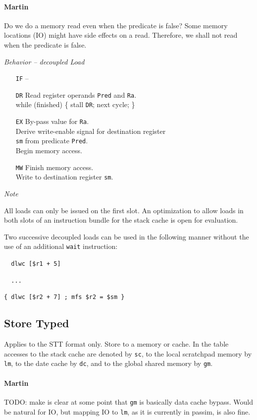 \documentclass{IEEEtran}
\newcommand{\code}[1]{{\texttt{#1}}}
\newcommand{\comment}[3]{\paragraph*{\textbf{#1}}{\color{#3}#2}}
\newcommand{\martin}[1]{\comment{Martin}{#1}{Blue}}
\newcommand{\NOT}{\texttildelow}
\begin{document}
\martin{Do we do a memory read even when the predicate is false?
Some memory locations (IO) might have side effects on a read.
Therefore, we shall not read when the predicate is false.}

\vspace{7mm}
\emph{Behavior -- decoupled Load}
\begin{itemize}
  \item[\texttt{IF}] --
  \item[\texttt{DR}] Read register operands \texttt{Pred} and \texttt{Ra}. \\
                     while (\NOT finished) \{ stall \texttt{DR}; next cycle; \}
  \item[\texttt{EX}] By-pass value for \texttt{Ra}. \\
                     Derive write-enable signal for destination register \\
                     \texttt{sm} from predicate \texttt{Pred}. \\
                     Begin memory access.
  \item[\texttt{MW}] Finish memory access. \\
                     Write to destination register \texttt{sm}.
\end{itemize}

\vspace{7mm}
\emph{Note}

All loads can only be issued on the first slot. An optimization to
allow loads in both slots of an instruction bundle for the stack cache
is open for evaluation.

Two successive decoupled loads can be used in the following manner without the
use of an additional \texttt{wait} instruction:

\texttt{~~dlwc   [\$r1 + 5]}

\texttt{~~...}

\texttt{\{ dlwc   [\$r2 + 7]   ;   mfs  \$r2 = \$sm \}}


\vspace{5mm}
\subsection{Store Typed} Applies to the STT format only. Store to a memory or
cache. In the table accesses to the stack cache are denoted by \texttt{sc}, to
the local scratchpad memory by \texttt{lm}, to the date cache by \texttt{dc},
and to the global shared memory by \texttt{gm}.

\martin{TODO: make is clear at some point that \code{gm} is basically
data cache bypass. Would be natural for IO, but mapping IO to \code{lm},
as it is currently in passim, is also fine.}
\end{document}
